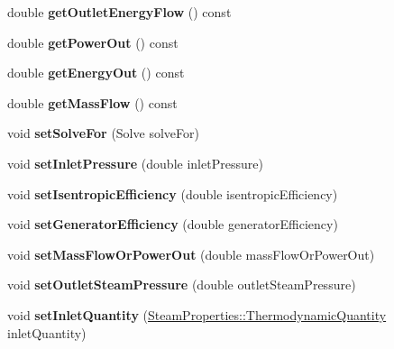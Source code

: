 \begin{DoxyCompactItemize}
double {\bfseries get\+Outlet\+Energy\+Flow} () const
\item 
\mbox{\label{class_turbine_a89585cc2fbfdbe67d539eae08c369fa2}} 
double {\bfseries get\+Power\+Out} () const
\item 
\mbox{\label{class_turbine_a143fc660274e0d65ccb8fc55cc2caf83}} 
double {\bfseries get\+Energy\+Out} () const
\item 
\mbox{\label{class_turbine_a4893a203dbbf9db9ca77a0b278c4c118}} 
double {\bfseries get\+Mass\+Flow} () const
\item 
\mbox{\label{class_turbine_a96f54a8fc572dae6c5298289de890f4d}} 
void {\bfseries set\+Solve\+For} (Solve solve\+For)
\item 
\mbox{\label{class_turbine_a04996baab9a40d449a69c737c00be8e4}} 
void {\bfseries set\+Inlet\+Pressure} (double inlet\+Pressure)
\item 
\mbox{\label{class_turbine_ae67daa481ef48bcf8aef84bcccb4611d}} 
void {\bfseries set\+Isentropic\+Efficiency} (double isentropic\+Efficiency)
\item 
\mbox{\label{class_turbine_a51e9c5050a5be51b86dc23e690bd3f40}} 
void {\bfseries set\+Generator\+Efficiency} (double generator\+Efficiency)
\item 
\mbox{\label{class_turbine_a73522631e2eeefa8ea14d5b537e3e760}} 
void {\bfseries set\+Mass\+Flow\+Or\+Power\+Out} (double mass\+Flow\+Or\+Power\+Out)
\item 
\mbox{\label{class_turbine_ab9612657de02e4523492b687917b4091}} 
void {\bfseries set\+Outlet\+Steam\+Pressure} (double outlet\+Steam\+Pressure)
\item 
\mbox{\label{class_turbine_aecc05c70870fb11bbc0bb4fe5d8438bd}} 
void {\bfseries set\+Inlet\+Quantity} (\hyperlink{class_steam_properties_ae0294bedf7d178c2d8fb6aed0f62fbff}{Steam\+Properties\+::\+Thermodynamic\+Quantity} inlet\+Quantity)
\item 
\mbox{\label{class_turbine_ad5ff4ba1657aac9519a6841336ec571c}} 

\end{DoxyCompactItemize}
